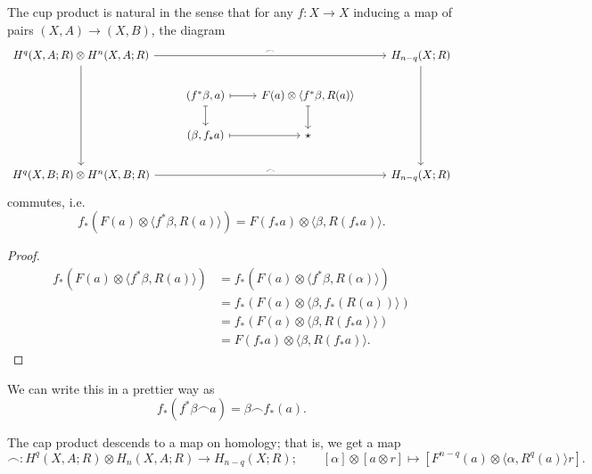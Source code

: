 \documentclass[main.tex]{subfiles}
\begin{document}
\begin{proposition}
  \label{prop:cup_product_natural}
  The cup product is natural in the sense that for any \(f\colon X \to X\) inducing a map of pairs \((X, A) \to (X, B)\), the diagram
  \begin{equation*}
    \begin{tikzcd}
      H^{q}(X, A; R) \otimes H^{n}(X, A; R)
      \arrow[rrr, "\frown"]
      \arrow[ddd]
      &&& H_{n-q}(X; R)
      \arrow[ddd]
      \\
      & (f^{*}\beta, a)
      \arrow[r, mapsto]
      \arrow[d, mapsto]
      & F(a) \otimes \langle f^{*}\beta, R(a) \rangle
      \arrow[d, mapsto]
      \\
      & (\beta, f_{*}a)
      \arrow[r, mapsto]
      & \star
      \\
      H^{q}(X, B; R) \otimes H^{n}(X, B; R)
      \arrow[rrr, "\frown"]
      &&& H_{n-q}(X; R)
    \end{tikzcd}
  \end{equation*}
  commutes, i.e.\
  \begin{equation*}
    f_{*}(F(a) \otimes \langle f^{*} \beta, R(a) \rangle) = F(f_{*}a) \otimes \langle \beta, R(f_{*}a) \rangle.
  \end{equation*}
\end{proposition}
\begin{proof}
  \begin{align*}
    f_{*}(F(a) \otimes \langle f^{*} \beta, R(a) \rangle) &= f_{*}(F(a) \otimes \langle f^{*}\beta, R(\alpha) \rangle) \\
    &= f_{*}(F(a) \otimes \langle \beta, f_{*}(R(a)) \rangle) \\
    &= f_{*}(F(a) \otimes \langle \beta, R(f_{*}a) \rangle) \\
    &= F(f_{*}a) \otimes \langle \beta, R(f_{*}a) \rangle.
  \end{align*}
\end{proof}
We can write this in a prettier way as
\begin{equation*}
  f_{*}(f^{*}\beta \frown a) = \beta \frown f_{*}(a).
\end{equation*}

\begin{proposition}
  The cap product descends to a map on homology; that is, we get a map
  \begin{equation*}
    \frown\colon H^{q}(X, A; R) \otimes H_{n}(X, A; R) \to H_{n-q}(X; R); \qquad [\alpha] \otimes [a \otimes r] \mapsto [F^{n-q}(a) \otimes \langle \alpha, R^{q}(a) \rangle r].
  \end{equation*}
\end{proposition}
\end{document}
